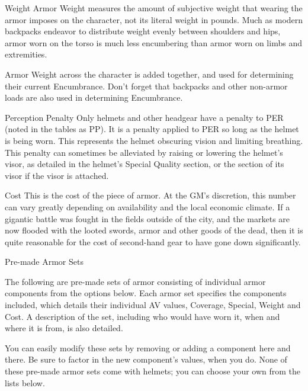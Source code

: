 \documentclass[oneside,11pt,english]{book}
\begin{document}
 

Weight 
Armor Weight measures the amount of subjective weight that wearing the armor imposes on the 
character, not its literal weight in pounds. Much as modern backpacks endeavor to distribute weight 
evenly between shoulders and hips, armor worn on the torso is much less encumbering than armor worn 
on limbs and extremities. 

 

Armor Weight across the character is added together, and used for determining their current 
Encumbrance. Don’t forget that backpacks and other non-armor loads are also used in determining 
Encumbrance. 

 

Perception Penalty 
Only helmets and other headgear have a penalty to PER (noted in the tables as PP). It is a penalty applied 
to PER so long as the helmet is being worn. This represents the helmet obscuring vision and limiting 
breathing. This penalty can sometimes be alleviated by raising or lowering the helmet’s visor, as detailed 
in the helmet’s Special Quality section, or the section of its visor if the visor is attached. 

 

Cost 
This is the cost of the piece of armor. At the GM’s discretion, this number can vary greatly depending on 
availability and the local economic climate. If a gigantic battle was fought in the fields outside of the city, 
and the markets are now flooded with the looted swords, armor and other goods of the dead, then it is 
quite reasonable for the cost of second-hand gear to have gone down significantly. 


 

Pre-made Armor Sets 

 

The following are pre-made sets of armor consisting of individual armor components from the options 
below. Each armor set specifies the components included, which details their individual AV values, 
Coverage, Special, Weight and Cost. A description of the set, including who would have worn it, when 
and where it is from, is also detailed. 

 

You can easily modify these sets by removing or adding a component here and there. Be sure to factor in 
the new component’s values, when you do. None of these pre-made armor sets come with helmets; you 
can choose your own from the lists below. 

 
\end{document}
